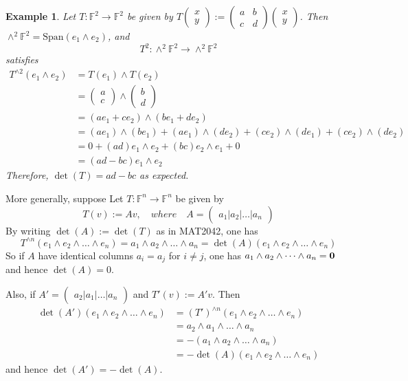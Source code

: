 \documentclass[12pt]{amsbook}
\newtheorem{example}[theorem]{Example}
\begin{document}
\begin{example}
    Let $T : \mathbb{F}^2 \to \mathbb{F}^2$ be given by $T\begin{pmatrix} x \\ y \end{pmatrix} := \begin{pmatrix} a & b \\ c & d \end{pmatrix} \begin{pmatrix} x \\ y \end{pmatrix}$. Then $\wedge^2 \mathbb{F}^2 = \mathrm{Span}(e_1 \wedge e_2)$, and
    $$T^2: \wedge^2 \mathbb{F}^2 \to \wedge^2 \mathbb{F}^2$$
    satisfies
\begin{align*}
    T^{\wedge 2}(e_1 \wedge e_2) &= T(e_1) \wedge T(e_2) \\
    &= \begin{pmatrix} a \\ c \end{pmatrix} \wedge \begin{pmatrix} b \\ d \end{pmatrix} \\
    &= (ae_1 + ce_2) \wedge (be_1 + de_2) \\
&= (ae_1)\wedge(be_1) + (ae_1)\wedge(de_2) + (ce_2)\wedge(de_1) + (ce_2)\wedge(de_2) \\
&= 0 + (ad)e_1 \wedge e_2 + (bc)e_2 \wedge e_1 + 0 \\
&= (ad - bc)e_1 \wedge e_2
\end{align*}
Therefore, $\det(T) = ad - bc$ as expected.
\end{example}

More generally, suppose 
   Let $T : \mathbb{F}^n \to \mathbb{F}^n$ be given by 
   $$T(v) := Av, \quad where\quad A = \begin{pmatrix} a_1 | a_2 | \dots | a_n \end{pmatrix}$$
   By writing $\det(A) := \det(T)$ as in MAT2042, one has
   $$T^{\wedge n}(e_1 \wedge e_2 \wedge \dots \wedge e_n) = a_1 \wedge a_2 \wedge \dots \wedge a_n = \det(A) (e_1 \wedge e_2 \wedge \dots \wedge e_n)$$
   So if $A$ have identical columns $a_i = a_j$ for $i \neq j$, one has
   $a_1 \wedge a_2 \wedge \dots \wedge a_n = {\bf 0}$ and hence 
   $\det(A) = 0$.

   Also, if $A' = \begin{pmatrix} a_2 | a_1 | \dots | a_n \end{pmatrix}$ and $T'(v) := A'v$. Then 
   \begin{align*}
   \det(A') (e_1 \wedge e_2 \wedge \dots \wedge e_n) &= (T')^{\wedge n}(e_1 \wedge e_2 \wedge \dots \wedge e_n) \\
   &= a_2 \wedge a_1 \wedge \dots \wedge a_n \\ 
   &= - (a_1 \wedge a_2 \wedge \dots \wedge a_n) \\
   &= -\det(A) (e_1 \wedge e_2 \wedge \dots \wedge e_n)\end{align*}
   and hence $\det(A') = -\det(A)$.
\end{document}

